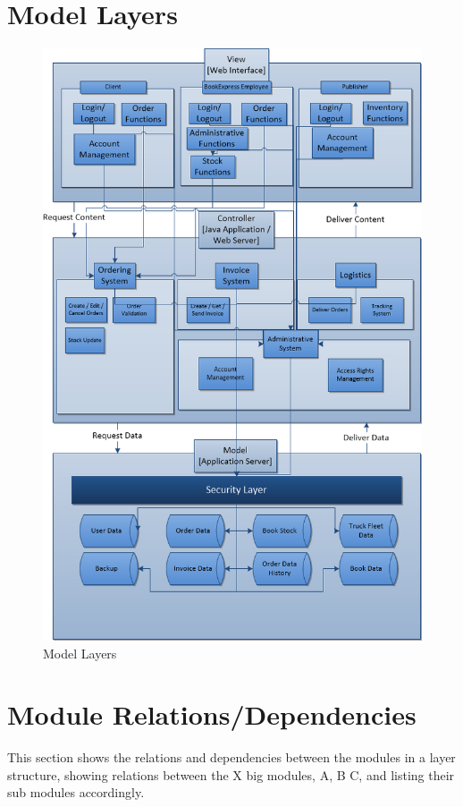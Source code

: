 \documentclass[11pt,a4paper,oneside,svgnames]{report}
\begin{document}
\section{Model Layers}
\begin{figure}[H]
 \begin{center}
  \includegraphics[width=\textwidth]{LayeredModel.png}
 \end{center}
 \caption{Model Layers}
\end{figure}

\section{Module Relations/Dependencies}
This section shows the relations and dependencies between the modules in a layer structure, showing relations between the X big modules, A, B C, and listing their sub modules accordingly.
\end{document}
